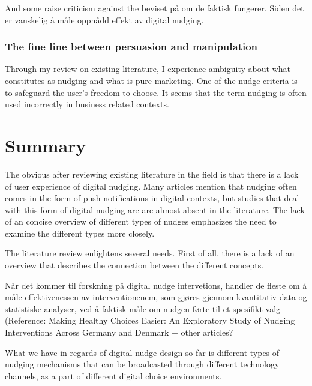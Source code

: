 And some raise criticism against the beviset på om de faktisk fungerer. Siden det er vanskelig å måle oppnådd effekt av digital nudging. 

\subsubsection{The fine line between persuasion and manipulation }
Through my review on existing literature, I experience ambiguity about what constitutes as nudging and what is pure marketing. One of the nudge criteria is to safeguard the user's freedom to choose. It seems that the term nudging is often used incorrectly in business related contexts.

\section{Summary}
The obvious after reviewing existing literature in the field is that there is a lack of user experience of digital nudging. Many articles mention that nudging often comes in the form of push notifications in digital contexts, but studies that deal with this form of digital nudging are are almost absent in the literature. The lack of an concise overview of different types of nudges emphasizes the need to examine the different types more closely. 

The literature review enlightens several needs. First of all, there is a lack of an overview that describes the connection between the different concepts.

Når det kommer til forskning på digital nudge intervetions, handler de fleste om å måle effektivenessen av interventionenem, som gjøres gjennom kvantitativ data og statistiske analyser, ved å faktisk måle om nudgen førte til et spesifikt valg (Reference: Making Healthy Choices Easier: An Exploratory Study of Nudging Interventions Across Germany and Denmark + other articles?

What we have in regards of digital nudge design so far is different types of nudging mechanisms that can be broadcasted through different technology channels, as a part of different digital choice environments.